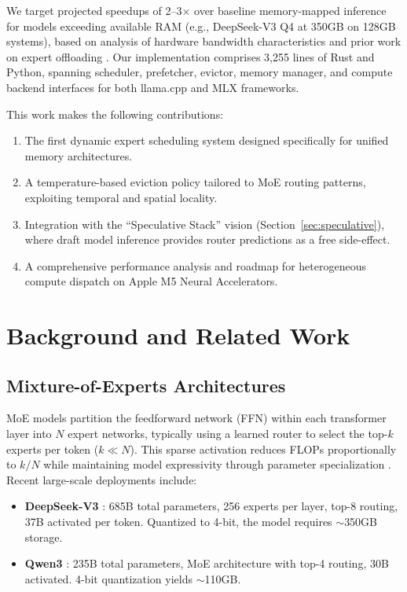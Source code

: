 \documentclass[11pt]{article}
\begin{document}
We target projected speedups of 2--3$\times$ over baseline memory-mapped inference for models exceeding available RAM (e.g., DeepSeek-V3 Q4 at 350GB on 128GB systems), based on analysis of hardware bandwidth characteristics and prior work on expert offloading \cite{hobbit2024,mlx2026}. Our implementation comprises 3,255 lines of Rust and Python, spanning scheduler, prefetcher, evictor, memory manager, and compute backend interfaces for both llama.cpp and MLX frameworks.

This work makes the following contributions:
\begin{enumerate}
    \item The first dynamic expert scheduling system designed specifically for unified memory architectures.
    \item A temperature-based eviction policy tailored to MoE routing patterns, exploiting temporal and spatial locality.
    \item Integration with the ``Speculative Stack'' vision (Section~\ref{sec:speculative}), where draft model inference provides router predictions as a free side-effect.
    \item A comprehensive performance analysis and roadmap for heterogeneous compute dispatch on Apple M5 Neural Accelerators.
\end{enumerate}

\section{Background and Related Work}

\subsection{Mixture-of-Experts Architectures}

MoE models partition the feedforward network (FFN) within each transformer layer into $N$ expert networks, typically using a learned router to select the top-$k$ experts per token ($k \ll N$). This sparse activation reduces FLOPs proportionally to $k/N$ while maintaining model expressivity through parameter specialization \cite{fedus2022switch}. Recent large-scale deployments include:

\begin{itemize}
    \item \textbf{DeepSeek-V3} \cite{deepseekv3}: 685B total parameters, 256 experts per layer, top-8 routing, 37B activated per token. Quantized to 4-bit, the model requires $\sim$350GB storage.
    \item \textbf{Qwen3} \cite{qwen3}: 235B total parameters, MoE architecture with top-4 routing, 30B activated. 4-bit quantization yields $\sim$110GB.
\end{itemize}
\end{document}
